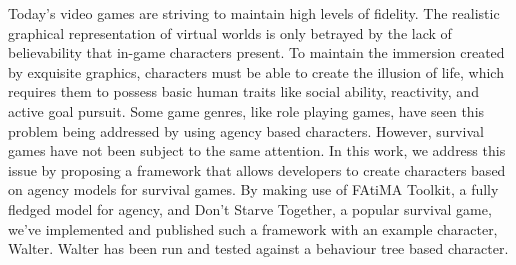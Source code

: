 \noindent Today's video games are striving to maintain high levels of fidelity.
The realistic graphical representation of virtual worlds is only betrayed by the lack of believability that in-game characters present.
To maintain the immersion created by exquisite graphics, characters must be able to create the illusion of life, which requires them to possess basic human traits like social ability, reactivity, and active goal pursuit.
Some game genres, like role playing games, have seen this problem being addressed by using agency based characters.
However, survival games have not been subject to the same attention.
In this work, we address this issue by proposing a framework that allows developers to create characters based on agency models for survival games.
By making use of FAtiMA Toolkit, a fully fledged model for agency, and Don't Starve Together, a popular survival game, we've implemented and published such a framework with an example character, Walter.
Walter has been run and tested against a behaviour tree based character.